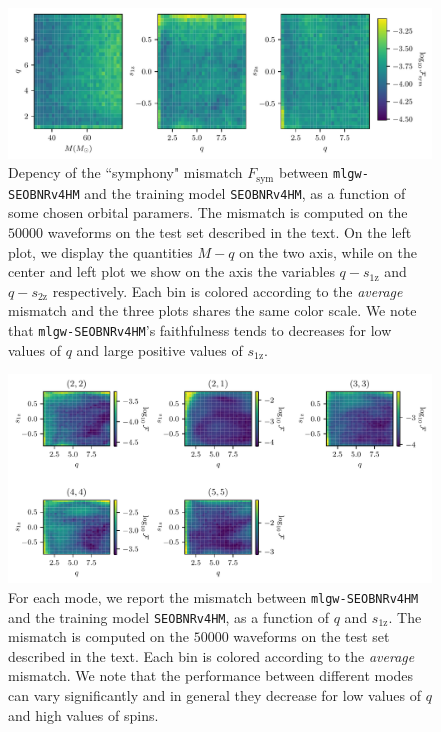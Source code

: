 \documentclass[twocolumn,showpacs,preprintnumbers,nofootinbib,prd,
superscriptaddress,10pt]{revtex4-1}
\begin{document}
\begin{figure}[t]
	\centering
	\includegraphics[width=\textwidth]{colormesh}
	\caption{
	Depency of the ``symphony" mismatch $F_\text{sym}$ between \texttt{mlgw-SEOBNRv4HM} and the training model \texttt{SEOBNRv4HM}, as a function of some chosen orbital paramers. The mismatch is computed on the $50000$ waveforms on the test set described in the text.
	On the left plot, we display the quantities $M-q$ on the two axis, while on the center and left plot we show on the axis the variables $q-s_\text{1z}$ and $q-s_\text{2z}$ respectively. 
	Each bin is colored according to the \textit{average} mismatch and the three plots shares the same color scale.
	We note that \texttt{mlgw-SEOBNRv4HM}'s faithfulness tends to decreases for low values of $q$ and large positive values of $s_\text{1z}$.
	}
	\label{fig:countour_plots}
\end{figure}

\begin{figure}[t]
	\centering
	\includegraphics[width=\textwidth]{colormesh_modes}
	\caption{
	For each mode, we report the mismatch between \texttt{mlgw-SEOBNRv4HM} and the training model \texttt{SEOBNRv4HM}, as a function of $q$ and $s_\text{1z}$. The mismatch is computed on the $50000$ waveforms on the test set described in the text.
	Each bin is colored according to the \textit{average} mismatch.
	We note that the performance between different modes can vary significantly and in general they decrease for low values of $q$ and high values of spins.
	}
	\label{fig:countour_plots_modes}
\end{figure}
\end{document}
